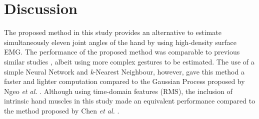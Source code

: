 \documentclass[conference]{IEEEtran}
\begin{document}
\section{Discussion}
The proposed method in this study provides an alternative to estimate simultaneously eleven joint 
angles of the hand by using high-density surface EMG. The performance of the proposed method was 
comparable to previous similar studies \cite{b16}\cite{b19}\cite{b20}, albeit using more complex gestures to be estimated. 
The use of a simple Neural Network and \textit{k}-Nearest Neighbour, however, gave this method a faster and lighter 
computation compared to the Gaussian Process proposed by Ngeo \textit{et al.} \cite{b16}. Although using time-domain 
features (RMS), the inclusion of intrinsic hand muscles in this study made an equivalent performance 
compared to the method proposed by Chen \textit{et al.} \cite{b19}.
\end{document}
